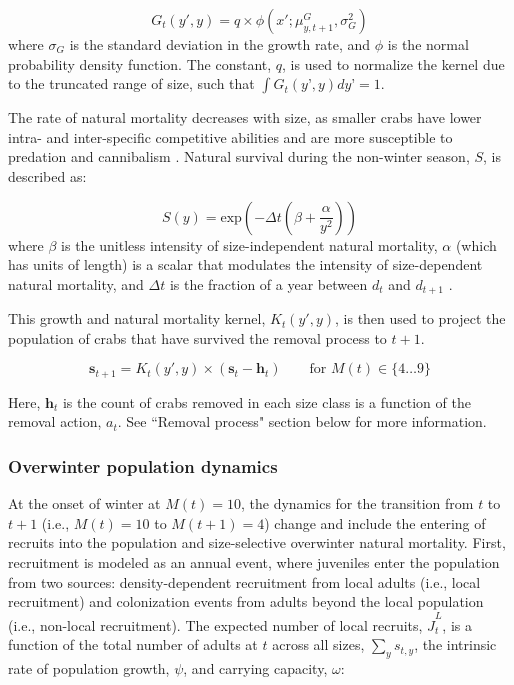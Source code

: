 \documentclass{article}
\begin{document}
\begin{equation}
G_t(y',y) = q\times\phi(x'; \mu^G_{y, t+1}, \sigma_G^2)
\end{equation}
where $\sigma_G$ is the standard deviation in the growth rate, and $\phi$ is the normal probability density function. The constant, $q$, is used to normalize the kernel due to the truncated range of size, such that $\int G_t(y’, y) dy’ = 1$.

The rate of natural mortality decreases with size, as smaller crabs have lower intra- and inter-specific competitive abilities and are more susceptible to predation and cannibalism \parencite{maszczyk2018body, grosholz2021stage}. Natural survival during the non-winter season, $S$, is described as: 

\begin{equation}
S(y) = \text{exp}\left(-\Delta t(\beta+\frac{\alpha}{y^2})\right)
\end{equation}
where $\beta$ is the unitless intensity of size-independent natural mortality, $\alpha$ (which has units of length) is a scalar that modulates the intensity of size-dependent natural mortality, and $\Delta t$ is the fraction of a year between $d_t$ and $d_{t+1}$ \parencite{carlson2010bayesian}.

This growth and natural mortality kernel, $K_t(y',y)$, is then used to project the population of crabs that have survived the removal process to $t+1$.

\begin{equation}
\textbf{s}_{t+1} = K_t(y',y) \times (\textbf{s}_t-\textbf{h}_t)  \qquad \text{for } M(t) \in \{4\dots9\} \label{eq:harvest1}
\end{equation}

Here, $\textbf{h}_t$ is the count of crabs removed in each size class is a function of the removal action, $a_t$. See ``Removal process" section below for more information.

\subsubsection{Overwinter population dynamics}

At the onset of winter at $M(t)= 10$, the dynamics for the transition from $t$ to $t+1$ (i.e., $M(t) = 10$ to $M(t+1) = 4$) change and include the entering of recruits into the population and size-selective overwinter natural mortality. First, recruitment is modeled as an annual event, where juveniles enter the population from two sources:  density-dependent recruitment from local adults (i.e., local recruitment) and colonization events from adults beyond the local population (i.e., non-local recruitment). The expected number of local recruits, $\hat{J}^L_t$, is a function of the total number of adults at $t$ across all sizes, $\sum_ys_{t,y}$, the intrinsic rate of population growth, $\psi$, and carrying capacity, $\omega$:
\end{document}
